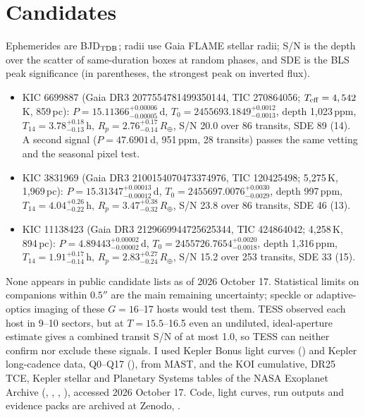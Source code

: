 \documentclass[RNAAS]{aastex701}
\begin{document}
\section{Candidates}
Ephemerides are BJD$_{\rm TDB}$; radii use Gaia FLAME stellar radii; S/N is the depth over the scatter of same-duration boxes at random phases, and SDE is the BLS peak significance (in parentheses, the strongest peak on inverted flux).
\begin{itemize}
\item KIC 6699887 (Gaia DR3 2077554781499350144, TIC 270864056; $T_{\rm eff}=4,542$\,K, 859\,pc): $P=15.11366^{+0.00006}_{-0.00005}$\,d, $T_0=2455693.1849^{+0.0012}_{-0.0013}$, depth 1,023\,ppm, $T_{14}=3.78^{+0.18}_{-0.13}$\,h, $R_p=2.76^{+0.17}_{-0.14}\,R_\oplus$, S/N 20.0 over 86 transits, SDE 89 (14). A second signal ($P=47.6901$\,d, 951\,ppm, 28 transits) passes the same vetting and the seasonal pixel test.
\item KIC 3831969 (Gaia DR3 2100154070473374976, TIC 120425498; 5,275\,K, 1,969\,pc): $P=15.31347^{+0.00013}_{-0.00012}$\,d, $T_0=2455697.0076^{+0.0030}_{-0.0029}$, depth 997\,ppm, $T_{14}=4.04^{+0.26}_{-0.22}$\,h, $R_p=3.47^{+0.38}_{-0.32}\,R_\oplus$, S/N 23.8 over 86 transits, SDE 46 (13).
\item KIC 11138423 (Gaia DR3 2129669944725625344, TIC 424864042; 4,258\,K, 894\,pc): $P=4.89443^{+0.00002}_{-0.00002}$\,d, $T_0=2455726.7654^{+0.0020}_{-0.0018}$, depth 1,316\,ppm, $T_{14}=1.91^{+0.17}_{-0.14}$\,h, $R_p=2.83^{+0.27}_{-0.24}\,R_\oplus$, S/N 15.2 over 253 transits, SDE 33 (15).
\end{itemize}
None appears in public candidate lists as of 2026 October 17. Statistical limits on companions within $0.5''$ are the main remaining uncertainty; speckle or adaptive-optics imaging of these $G=16$--17 hosts would test them. TESS observed each host in 9--10 sectors, but at $T=15.5$--16.5 even an undiluted, ideal-aperture estimate \citep{Stassun2018} gives a combined transit S/N of at most 1.0, so TESS can neither confirm nor exclude these signals. I used Kepler Bonus light curves () and Kepler long-cadence data, Q0--Q17 (), from MAST, and the KOI cumulative, DR25 TCE, Kepler stellar and Planetary Systems tables of the NASA Exoplanet Archive (, , , ), accessed 2026 October 17. Code, light curves, run outputs and evidence packs are archived at Zenodo, .
\end{document}
